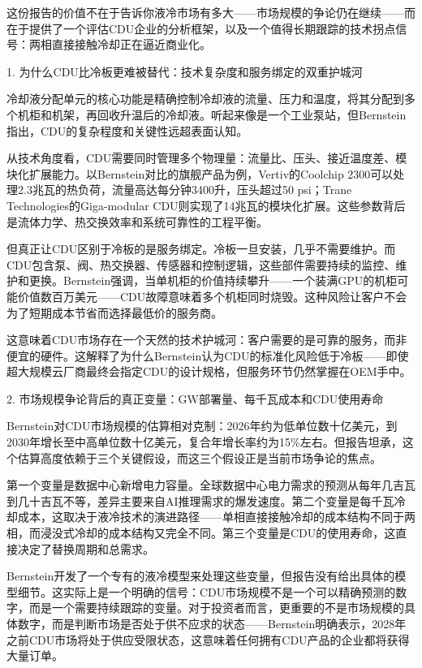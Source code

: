 \documentclass[11pt]{ctexart}
\begin{document}
这份报告的价值不在于告诉你液冷市场有多大——市场规模的争论仍在继续——而在于提供了一个评估CDU企业的分析框架，以及一个值得长期跟踪的技术拐点信号：两相直接接触冷却正在逼近商业化。

1. 为什么CDU比冷板更难被替代：技术复杂度和服务绑定的双重护城河

冷却液分配单元的核心功能是精确控制冷却液的流量、压力和温度，将其分配到多个机柜和机架，再回收升温后的冷却液。听起来像是一个工业泵站，但Bernstein指出，CDU的复杂程度和关键性远超表面认知。

从技术角度看，CDU需要同时管理多个物理量：流量比、压头、接近温度差、模块化扩展能力。以Bernstein对比的旗舰产品为例，Vertiv的Coolchip 2300可以处理2.3兆瓦的热负荷，流量高达每分钟3400升，压头超过50 psi；Trane Technologies的Giga-modular CDU则实现了14兆瓦的模块化扩展。这些参数背后是流体力学、热交换效率和系统可靠性的工程平衡。

但真正让CDU区别于冷板的是服务绑定。冷板一旦安装，几乎不需要维护。而CDU包含泵、阀、热交换器、传感器和控制逻辑，这些部件需要持续的监控、维护和更换。Bernstein强调，当单机柜的价值持续攀升——一个装满GPU的机柜可能价值数百万美元——CDU故障意味着多个机柜同时烧毁。这种风险让客户不会为了短期成本节省而选择最低价的服务商。

这意味着CDU市场存在一个天然的技术护城河：客户需要的是可靠的服务，而非便宜的硬件。这解释了为什么Bernstein认为CDU的标准化风险低于冷板——即使超大规模云厂商最终会指定CDU的设计规格，但服务环节仍然掌握在OEM手中。

2. 市场规模争论背后的真正变量：GW部署量、每千瓦成本和CDU使用寿命

Bernstein对CDU市场规模的估算相对克制：2026年约为低单位数十亿美元，到2030年增长至中高单位数十亿美元，复合年增长率约为15\%左右。但报告坦承，这个估算高度依赖于三个关键假设，而这三个假设正是当前市场争论的焦点。

第一个变量是数据中心新增电力容量。全球数据中心电力需求的预测从每年几吉瓦到几十吉瓦不等，差异主要来自AI推理需求的爆发速度。第二个变量是每千瓦冷却成本，这取决于液冷技术的演进路径——单相直接接触冷却的成本结构不同于两相，而浸没式冷却的成本结构又完全不同。第三个变量是CDU的使用寿命，这直接决定了替换周期和总需求。

Bernstein开发了一个专有的液冷模型来处理这些变量，但报告没有给出具体的模型细节。这实际上是一个明确的信号：CDU市场规模不是一个可以精确预测的数字，而是一个需要持续跟踪的变量。对于投资者而言，更重要的不是市场规模的具体数字，而是判断市场是否处于供不应求的状态——Bernstein明确表示，2028年之前CDU市场将处于供应受限状态，这意味着任何拥有CDU产品的企业都将获得大量订单。
\end{document}
